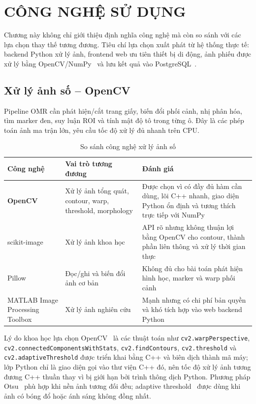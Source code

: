 \chapter{CÔNG NGHỆ SỬ DỤNG}
Chương này không chỉ giới thiệu định nghĩa công nghệ mà còn so sánh với các lựa chọn thay thế tương đương. Tiêu chí lựa chọn xuất phát từ hệ thống thực tế: backend Python xử lý ảnh, frontend web ưu tiên thiết bị di động, ảnh phiếu được xử lý bằng OpenCV/NumPy~\cite{numpy} và lưu kết quả vào PostgreSQL~\cite{postgresql}.

\section{Xử lý ảnh số -- OpenCV}

Pipeline OMR cần phát hiện/cắt trang giấy, biến đổi phối cảnh, nhị phân hóa, tìm marker đen, suy luận ROI và tính mật độ tô trong từng ô. Đây là các phép toán ảnh ma trận lớn, yêu cầu tốc độ xử lý đủ nhanh trên CPU.

\begin{table}[H]
\centering
\caption{So sánh công nghệ xử lý ảnh số}
\label{tab:so-sanh-xu-ly-anh}
\renewcommand{\arraystretch}{1.25}
\begin{tabular}{|p{3cm}|p{4.5cm}|p{7cm}|}
\hline
\textbf{Công nghệ} & \textbf{Vai trò tương đương} & \textbf{Đánh giá} \\
\hline

\textbf{OpenCV} &
Xử lý ảnh tổng quát, contour, warp, threshold, morphology &
Được chọn vì có đầy đủ hàm cần dùng, lõi C++ nhanh, giao diện Python ổn định và tương thích trực tiếp với NumPy \\
\hline

scikit-image &
Xử lý ảnh khoa học &
API rõ nhưng không thuận lợi bằng OpenCV cho contour, thành phần liên thông và xử lý thời gian thực \\
\hline

Pillow &
Đọc/ghi và biến đổi ảnh cơ bản &
Không đủ cho bài toán phát hiện hình học, marker và warp phối cảnh \\
\hline

MATLAB Image Processing Toolbox &
Xử lý ảnh nghiên cứu &
Mạnh nhưng có chi phí bản quyền và khó tích hợp vào web backend Python \\
\hline

\end{tabular}
\end{table}

Lý do khoa học lựa chọn OpenCV~\cite{opencv,learning-opencv} là các thuật toán như \texttt{cv2.warpPerspective}, \texttt{cv2.connectedComponentsWithStats}, \texttt{cv2.findContours}, \texttt{cv2.threshold} và \texttt{cv2.adaptiveThreshold} được triển khai bằng C++ và biên dịch thành mã máy; lớp Python chỉ là giao diện gọi vào thư viện C++ đó, nên tốc độ xử lý ảnh tương đương C++ thuần thay vì bị giới hạn bởi trình thông dịch Python. Phương pháp Otsu~\cite{otsu} phù hợp khi nền ảnh tương đối đều; adaptive threshold~\cite{gonzalez-dip} được dùng khi ảnh có bóng đổ hoặc ánh sáng không đồng nhất.

